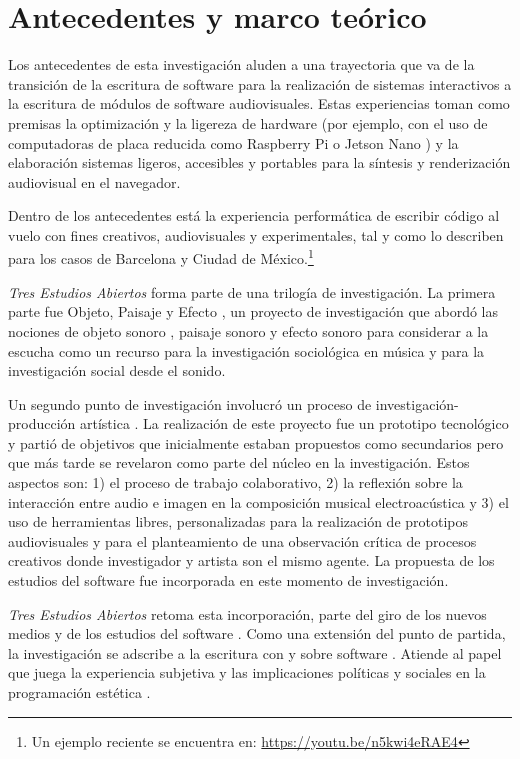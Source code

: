 \section*{Antecedentes y marco teórico}

Los antecedentes de esta investigación aluden a una trayectoria que va de la transición de la escritura de software para la realización de sistemas interactivos a la escritura de módulos de software audiovisuales. Estas experiencias toman como premisas la optimización y la ligereza de hardware (por ejemplo, con el uso de computadoras de placa reducida como Raspberry Pi o Jetson Nano ) y la elaboración sistemas ligeros, accesibles y portables para la síntesis y renderización audiovisual en el navegador.

Dentro de los antecedentes está la experiencia performática de escribir código al vuelo con fines creativos, audiovisuales y experimentales, tal y como lo describen \cite{villasenor} para los casos de Barcelona y Ciudad de México.\footnote{Un ejemplo reciente se encuentra en: \url{https://youtu.be/n5kwi4eRAE4}} 

\textit{Tres Estudios Abiertos} forma parte de una trilogía de investigación. La primera parte fue Objeto, Paisaje y Efecto \citep{ocelotlLic}, un proyecto de investigación que abordó las nociones de objeto sonoro \citep{schaeffer}, paisaje sonoro\citep{schafer1} y efecto sonoro \citep{augoyard} para considerar a la escucha como un recurso para la investigación sociológica en música y para la investigación social desde el sonido. 

Un segundo punto de investigación involucró un proceso de investigación-producción artística \citep{ocelotlMas}. La realización de este proyecto fue un prototipo tecnológico y partió de objetivos que inicialmente estaban propuestos como secundarios pero que más tarde se revelaron como parte del núcleo en la investigación. Estos aspectos son: 1) el proceso de trabajo colaborativo, 2) la reflexión sobre la interacción entre audio e imagen en la composición musical electroacústica y 3) el uso de herramientas libres, personalizadas para la realización de prototipos audiovisuales y para el planteamiento de una observación crítica de procesos creativos donde investigador y artista son el mismo agente. La propuesta de los estudios del software fue incorporada en este momento de investigación. 

\textit{Tres Estudios Abiertos} retoma esta incorporación, parte del giro de los nuevos medios y de los estudios del software \citep{manovichlanguage}. Como una extensión del punto de partida, la investigación se adscribe a la escritura con y sobre software \citep{aestheticProgramming}. Atiende al papel que juega la experiencia subjetiva y las implicaciones políticas y sociales en la programación estética \citep{speakingCode}. 

